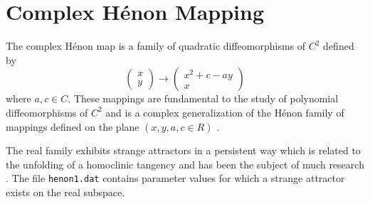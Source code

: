 \section{Complex H\'{e}non Mapping}

The complex H\'{e}non map is a family of quadratic diffeomorphisms of $C^2$
defined by
\[
\left( \begin{array}{c} x \\ y \end{array} \right)
\rightarrow \left( \begin{array}{c} x^2+c-ay \\ x \end{array} \right)
\]
where $a,c\in C$.  These mappings are fundamental to the study of
polynomial diffeomorphisms of $C^2$ and is a complex generalization
of the H\'{e}non family of mappings defined on the plane 
$(x,y,a,c\in R)$ \cite{Henon:mapping}.

The real family exhibits strange attractors in a persistent way which is related
to the unfolding of a homoclinic tangency and has been the subject of
much research \cite{BC,MoraViana:abundance}.
The file {\tt henon1.dat} contains parameter values for which a strange attractor
exists on the real subspace.
